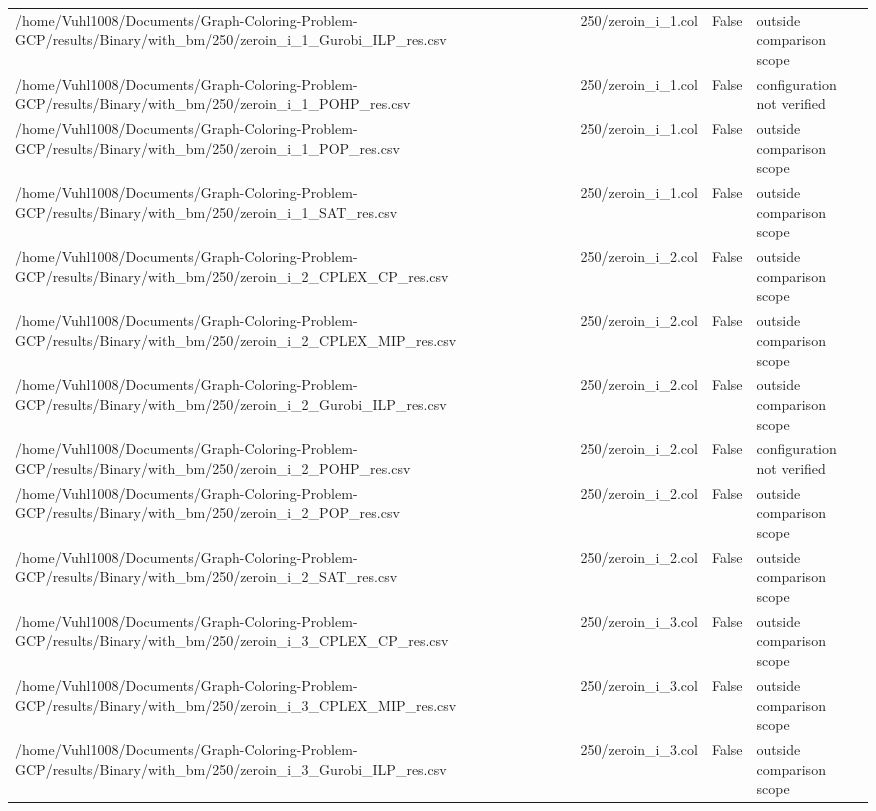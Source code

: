 \begin{table}[htbp]
\begin{tabular}{llll}
/home/Vuhl1008/Documents/Graph-Coloring-Problem-GCP/results/Binary/with\_bm/250/zeroin\_i\_1\_Gurobi\_ILP\_res.csv & 250/zeroin\_i\_1.col & False & outside comparison scope \\
/home/Vuhl1008/Documents/Graph-Coloring-Problem-GCP/results/Binary/with\_bm/250/zeroin\_i\_1\_POHP\_res.csv & 250/zeroin\_i\_1.col & False & configuration not verified \\
/home/Vuhl1008/Documents/Graph-Coloring-Problem-GCP/results/Binary/with\_bm/250/zeroin\_i\_1\_POP\_res.csv & 250/zeroin\_i\_1.col & False & outside comparison scope \\
/home/Vuhl1008/Documents/Graph-Coloring-Problem-GCP/results/Binary/with\_bm/250/zeroin\_i\_1\_SAT\_res.csv & 250/zeroin\_i\_1.col & False & outside comparison scope \\
/home/Vuhl1008/Documents/Graph-Coloring-Problem-GCP/results/Binary/with\_bm/250/zeroin\_i\_2\_CPLEX\_CP\_res.csv & 250/zeroin\_i\_2.col & False & outside comparison scope \\
/home/Vuhl1008/Documents/Graph-Coloring-Problem-GCP/results/Binary/with\_bm/250/zeroin\_i\_2\_CPLEX\_MIP\_res.csv & 250/zeroin\_i\_2.col & False & outside comparison scope \\
/home/Vuhl1008/Documents/Graph-Coloring-Problem-GCP/results/Binary/with\_bm/250/zeroin\_i\_2\_Gurobi\_ILP\_res.csv & 250/zeroin\_i\_2.col & False & outside comparison scope \\
/home/Vuhl1008/Documents/Graph-Coloring-Problem-GCP/results/Binary/with\_bm/250/zeroin\_i\_2\_POHP\_res.csv & 250/zeroin\_i\_2.col & False & configuration not verified \\
/home/Vuhl1008/Documents/Graph-Coloring-Problem-GCP/results/Binary/with\_bm/250/zeroin\_i\_2\_POP\_res.csv & 250/zeroin\_i\_2.col & False & outside comparison scope \\
/home/Vuhl1008/Documents/Graph-Coloring-Problem-GCP/results/Binary/with\_bm/250/zeroin\_i\_2\_SAT\_res.csv & 250/zeroin\_i\_2.col & False & outside comparison scope \\
/home/Vuhl1008/Documents/Graph-Coloring-Problem-GCP/results/Binary/with\_bm/250/zeroin\_i\_3\_CPLEX\_CP\_res.csv & 250/zeroin\_i\_3.col & False & outside comparison scope \\
/home/Vuhl1008/Documents/Graph-Coloring-Problem-GCP/results/Binary/with\_bm/250/zeroin\_i\_3\_CPLEX\_MIP\_res.csv & 250/zeroin\_i\_3.col & False & outside comparison scope \\
/home/Vuhl1008/Documents/Graph-Coloring-Problem-GCP/results/Binary/with\_bm/250/zeroin\_i\_3\_Gurobi\_ILP\_res.csv & 250/zeroin\_i\_3.col & False & outside comparison scope \\

\end{tabular}
\end{table}
